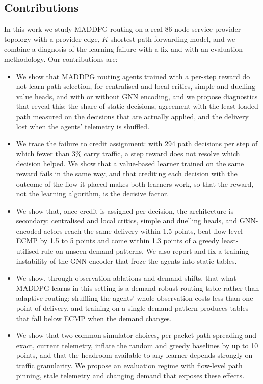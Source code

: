 \documentclass[10pt,journal,comsoc]{IEEEtran}
\begin{document}
\subsection{Contributions}
In this work we study MADDPG routing on a real 86-node service-provider topology with a provider-edge, $K$-shortest-path forwarding model, and we combine a diagnosis of the learning failure with a fix and with an evaluation methodology. Our contributions are:
\begin{itemize}
  \item We show that MADDPG routing agents trained with a per-step reward do not learn path selection, for centralised and local critics, simple and duelling value heads, and with or without GNN encoding, and we propose diagnostics that reveal this: the share of static decisions, agreement with the least-loaded path measured on the decisions that are actually applied, and the delivery lost when the agents' telemetry is shuffled.
  \item We trace the failure to credit assignment: with 294 path decisions per step of which fewer than 3\% carry traffic, a step reward does not resolve which decision helped. We show that a value-based learner trained on the same reward fails in the same way, and that crediting each decision with the outcome of the flow it placed makes both learners work, so that the reward, not the learning algorithm, is the decisive factor.
  \item We show that, once credit is assigned per decision, the architecture is secondary: centralised and local critics, simple and duelling heads, and GNN-encoded actors reach the same delivery within 1.5 points, beat flow-level ECMP by 1.5 to 5 points and come within 1.3 points of a greedy least-utilised rule on unseen demand patterns. We also report and fix a training instability of the GNN encoder that froze the agents into static tables.
  \item We show, through observation ablations and demand shifts, that what MADDPG learns in this setting is a demand-robust routing table rather than adaptive routing: shuffling the agents' whole observation costs less than one point of delivery, and training on a single demand pattern produces tables that fall below ECMP when the demand changes.
  \item We show that two common simulator choices, per-packet path spreading and exact, current telemetry, inflate the random and greedy baselines by up to 10 points, and that the headroom available to any learner depends strongly on traffic granularity. We propose an evaluation regime with flow-level path pinning, stale telemetry and changing demand that exposes these effects.
\end{itemize}
\end{document}
